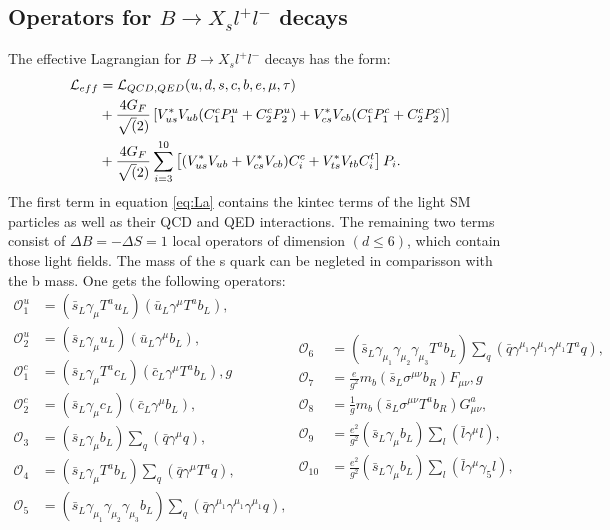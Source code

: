 \documentclass[english]{uzhpub}
\begin{document}
\subsection{Operators for $B \rightarrow X_s l^+l^-$ decays}
The effective Lagrangian for $B \rightarrow X_s l^+l^-$ decays has the form: \\
\begin{align}
 \mathcal{L}_{eff} & = \mathcal{L}_{QCD,QED}(u,d,s,c,b,e,\mu,\tau) \notag                                                                                           \\
                   & + \frac{4G_F}{\sqrt(2)} \left[ V_{us}^* V_{ub} (C_1^c P_1^u + C_2^c P_2^u) + V_{cs}^* V_{cb} (C_1^c P_1^c + C_2^c P_2^c) \right] \label{eq:La} \\
                   & + \frac{4G_F}{\sqrt(2)} \sum_{i=3}^{10} \left[ (V_{us}^* V_{ub} + V_{cs}^* V_{cb})C_i^c + V_{ts}^* V_{tb} C_i^t  \right]P_i . \notag
\end{align}
The first term in equation \ref{eq:La} contains the kintec terms of the light SM particles as well as their QCD and QED interactions. The remaining two terms consist of $\Delta B = - \Delta S =1$ local operators of dimension $(d \leq 6)$, which contain those light fields. The mass of the s quark can be negleted in comparisson with the b mass. One gets the following operators:
\begin{equation}
 \begin{split}
  \mathcal{O}_1^u &= (\bar{s}_L \gamma_\mu T^a u_L)(\bar{u}_L \gamma^\mu T^a b_L),  \\
  \mathcal{O}_2^u &= (\bar{s}_L \gamma_\mu u_L) (\bar{u}_L \gamma^\mu b_L),  \\
  \mathcal{O}_1^c &= (\bar{s}_L \gamma_\mu T^a c_L) (\bar{c}_L \gamma^\mu T^a b_L), g \\
  \mathcal{O}_2^c &= (\bar{s}_L \gamma_\mu c_L) (\bar{c}_L \gamma^\mu b_L),  \\
  \mathcal{O}_3 &= (\bar{s}_L \gamma_\mu b_L) \sum_q (\bar{q} \gamma^\mu q),  \\
  \mathcal{O}_4 &= (\bar{s}_L \gamma_\mu T^a b_L) \sum_q (\bar{q} \gamma^\mu T^a q),  \\
  \mathcal{O}_5 &= (\bar{s}_L \gamma_{\mu_1} \gamma_{\mu_2} \gamma_{\mu_3} b_L ) \sum_q (\bar{q} \gamma^{\mu_1} \gamma^{\mu_1} \gamma^{\mu_1} q),
 \end{split}
 \begin{split}
  \mathcal{O}_6 &= (\bar{s}_L \gamma_{\mu_1} \gamma_{\mu_2} \gamma_{\mu_3} T^a b_L) \sum_q (\bar{q} \gamma^{\mu_1} \gamma^{\mu_1} \gamma^{\mu_1} T^a q), \\
  \mathcal{O}_7 &= \frac{e}{g^2} m_b (\bar{s}_L \sigma^{\mu \nu} b_R) F_{\mu \nu},g \\
  \mathcal{O}_8 &= \frac{1}{g} m_b (\bar{s}_L \sigma^{\mu \nu} T^a b_R) G_{\mu \nu}^a,  \\
  \mathcal{O}_9 &= \frac{e^2}{g^2} (\bar{s}_L \gamma_\mu b_L) \sum_l (\bar{l} \gamma^\mu l),  \\
  \mathcal{O}_{10} &= \frac{e^2}{g^2} (\bar{s}_L \gamma_\mu b_L) \sum_l (\bar{l} \gamma^\mu \gamma_5 l),
 \end{split}
 \label{eq:P}
\end{equation}
\end{document}
